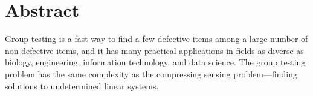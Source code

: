 \chapter*{Abstract}
%
%



%
%
%
%
%
%
%
Group testing is a fast way to find a few defective items among a large number of non-defective items, and it has many practical applications in fields as diverse as biology, engineering, information technology, and data science. The group testing problem has the same complexity as the compressing sensing problem—finding solutions to undetermined linear systems.

